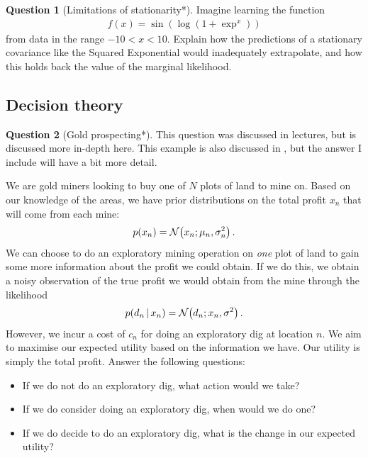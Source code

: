 \documentclass[a4paper]{article}
\theoremstyle{definition}
\newtheorem{question}{Question}
\begin{document}
\begin{question}[Limitations of stationarity*]
\label{q:limitations-of-stationarity}
Imagine learning the function
\begin{align}
f(x) = \sin \left(\log(1+\exp^x) \right)
\end{align}
from data in the range $-10 < x < 10$. Explain how the predictions of a stationary covariance like the Squared Exponential would inadequately extrapolate, and how this holds back the value of the marginal likelihood.
\end{question}


\subsection{Decision theory}
\begin{question}[Gold prospecting*]
\label{q:gold-prospecting}
This question was discussed in lectures, but is discussed more in-depth here. This example is also discussed in \citet[ch.~36]{itila}, but the answer I include will have a bit more detail.

We are gold miners looking to buy one of $N$ plots of land to mine on. Based on our knowledge of the areas, we have prior distributions on the total profit $x_n$ that will come from each mine:
\begin{align}
p(x_n) = \NormDist{x_n; \mu_n, \sigma^2_n} \,.
\end{align}
We can choose to do an exploratory mining operation on \emph{one} plot of land to gain some more information about the profit we could obtain. If we do this, we obtain a noisy observation of the true profit we would obtain from the mine through the likelihood
\begin{align}
p(d_n\given x_n) = \NormDist{d_n; x_n, \sigma^2} \,.
\end{align}
However, we incur a cost of $c_n$ for doing an exploratory dig at location $n$. We aim to maximise our expected utility based on the information we have. Our utility is simply the total profit. Answer the following questions:
\begin{itemize}
\item If we do not do an exploratory dig, what action would we take?
\item If we do consider doing an exploratory dig, when would we do one?
\item If we do decide to do an exploratory dig, what is the change in our expected utility?
\end{itemize}
\end{question}
\end{document}

